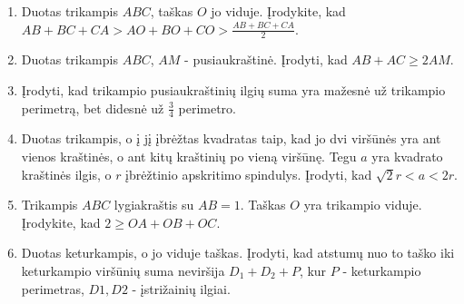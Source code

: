 \begin{enumerate}
\item Duotas trikampis $ABC$, taškas $O$ jo viduje.
  Įrodykite, kad $AB+BC+CA>AO+BO+CO> \frac{AB+BC+CA}{2}$.
\item Duotas trikampis $ABC$, $AM$ - pusiaukraštinė. Įrodyti,
  kad $AB + AC \geq 2AM$.
\item Įrodyti, kad trikampio pusiaukraštinių ilgių suma yra
  mažesnė už trikampio perimetrą, bet didesnė už
  $\frac{3}{4}$ perimetro.
\item Duotas trikampis, o į jį įbrėžtas kvadratas taip, kad 
  jo dvi viršūnės yra ant vienos kraštinės, o ant kitų kraštinių
  po vieną viršūnę. Tegu $a$ yra kvadrato kraštinės ilgis, o
  $r$ įbrėžtinio apskritimo spindulys. Įrodyti, kad
  $\sqrt{2}r<a<2r$. 
\item Trikampis $ABC$ lygiakraštis su $AB=1$. Taškas $O$ yra
  trikampio viduje. Įrodykite, kad $2\geq OA+OB+OC$.

\item Duotas keturkampis, o jo viduje taškas. Įrodyti, kad
  atstumų nuo to taško iki keturkampio viršūnių suma
  neviršija $D_1 + D_2 + P$, kur $P$ - keturkampio
  perimetras, $D1, D2$ - įstrižainių ilgiai.


\end{enumerate}
